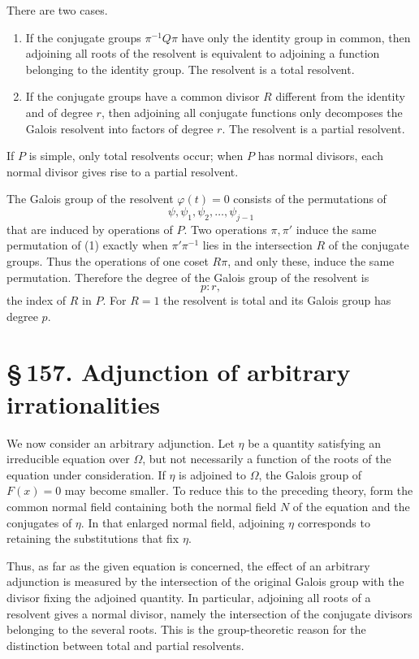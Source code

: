 \documentclass[11pt]{article}
\providecommand{\sect}[2]{\section*{\S\,#1. #2}}
\begin{document}
There are two cases.

\begin{enumerate}[label=\arabic*.,leftmargin=2em]
\item If the conjugate groups $\pi^{-1}Q\pi$ have only the identity group in common, then adjoining all roots of the resolvent is equivalent to adjoining a function belonging to the identity group. The resolvent is a total resolvent.
\item If the conjugate groups have a common divisor $R$ different from the identity and of degree $r$, then adjoining all conjugate functions only decomposes the Galois resolvent into factors of degree $r$. The resolvent is a partial resolvent.
\end{enumerate}

If $P$ is simple, only total resolvents occur; when $P$ has normal divisors, each normal divisor gives rise to a partial resolvent.

The Galois group of the resolvent $\varphi(t)=0$ consists of the permutations of
\[
        \psi,
\psi_1,
\psi_2,
\ldots,
\psi_{j-1}
\tag{1}
\]
that are induced by operations of $P$. Two operations $\pi,\pi'$ induce the same permutation of (1) exactly when $\pi'\pi^{-1}$ lies in the intersection $R$ of the conjugate groups. Thus the operations of one coset $R\pi$, and only these, induce the same permutation. Therefore the degree of the Galois group of the resolvent is
\[
        p:r,
\]
the index of $R$ in $P$. For $R=1$ the resolvent is total and its Galois group has degree $p$.

\sect{157}{Adjunction of arbitrary irrationalities}

We now consider an arbitrary adjunction. Let $\eta$ be a quantity satisfying an irreducible equation over $\Omega$, but not necessarily a function of the roots of the equation under consideration. If $\eta$ is adjoined to $\Omega$, the Galois group of $F(x)=0$ may become smaller. To reduce this to the preceding theory, form the common normal field containing both the normal field $N$ of the equation and the conjugates of $\eta$. In that enlarged normal field, adjoining $\eta$ corresponds to retaining the substitutions that fix $\eta$.

Thus, as far as the given equation is concerned, the effect of an arbitrary adjunction is measured by the intersection of the original Galois group with the divisor fixing the adjoined quantity. In particular, adjoining all roots of a resolvent gives a normal divisor, namely the intersection of the conjugate divisors belonging to the several roots. This is the group-theoretic reason for the distinction between total and partial resolvents.
\end{document}
